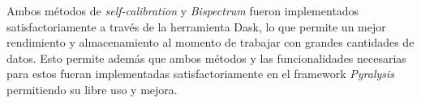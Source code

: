 Ambos métodos de \textit{self-calibration} y \textit{Bispectrum} fueron implementados satisfactoriamente a través de la herramienta Dask, lo que permite un mejor rendimiento y almacenamiento al momento de trabajar con grandes cantidades de datos. Esto permite además que ambos métodos y las funcionalidades necesarias para estos fueran implementadas satisfactoriamente en el framework \textit{Pyralysis} permitiendo su libre uso y mejora. 